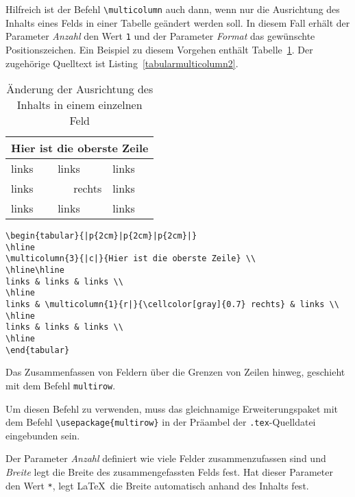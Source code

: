Hilfreich ist der Befehl \verb!\multicolumn! auch dann, wenn nur die Ausrichtung des Inhalts eines Felds in einer Tabelle geändert werden soll. In
diesem Fall erhält der Parameter \textsl{Anzahl} den Wert \verb!1! und der Parameter \textsl{Format} das gewünschte Positionszeichen. 
Ein Beispiel zu diesem Vorgehen enthält Tabelle~\ref{Tabelle_Multicolumn2}. Der zugehörige Quelltext ist Listing~\ref{tabularmulticolumn2}.


\begin{table}[h!tb]
\centering
\caption{Änderung der Ausrichtung des Inhalts in einem einzelnen Feld}
\label{Tabelle_Multicolumn2}
\begin{tabular}{|p{2cm}|p{2cm}|p{2cm}|}
\hline
\multicolumn{3}{|c|}{Hier ist die oberste Zeile} \\
\hline\hline
links & links & links \\
\hline
links & \multicolumn{1}{r|}{\cellcolor[gray]{0.7} rechts} & links \\
\hline
links & links & links \\
\hline
\end{tabular}
\end{table}

\begin{lstlisting}[caption={Mit dem Befehl \texttt{multicolumn} kann auch die Ausrichtung nur eines einzelnen Feldes angepasst werden},label=tabularmulticolumn2, style=customlatex]
\begin{tabular}{|p{2cm}|p{2cm}|p{2cm}|}
\hline
\multicolumn{3}{|c|}{Hier ist die oberste Zeile} \\
\hline\hline
links & links & links \\
\hline
links & \multicolumn{1}{r|}{\cellcolor[gray]{0.7} rechts} & links \\
\hline
links & links & links \\
\hline
\end{tabular}
\end{lstlisting}


Das Zusammenfassen von Feldern über die Grenzen von Zeilen hinweg, geschieht mit dem Befehl \verb!multirow!.


Um diesen Befehl zu verwenden, muss das gleichnamige Erweiterungspaket mit dem Befehl \verb!\usepackage{multirow}! in der Präambel der \verb!.tex!-Quelldatei eingebunden sein.

Der Parameter \textsl{Anzahl} definiert wie viele Felder zusammenzufassen sind und \textsl{Breite} legt die Breite des zusammengefassten Felds fest. Hat dieser Parameter den Wert \verb!*!, legt \LaTeX\ die Breite automatisch anhand des Inhalts fest.


